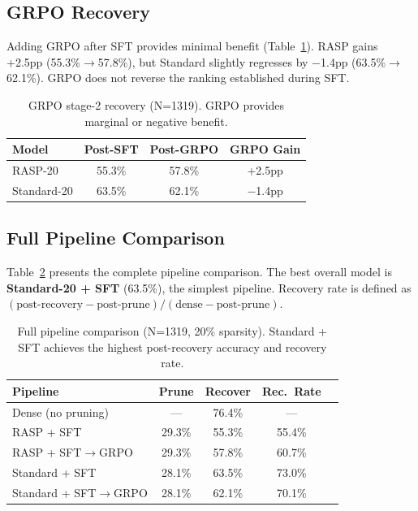\documentclass[11pt,a4paper]{article}
\begin{document}
\subsection{GRPO Recovery}
\label{sec:grpo}

Adding GRPO after SFT provides minimal benefit (Table~\ref{tab:grpo}). RASP gains +2.5pp (55.3\%$\to$57.8\%), but Standard slightly regresses by $-$1.4pp (63.5\%$\to$62.1\%). GRPO does not reverse the ranking established during SFT.

\begin{table}[t]
\centering
\small
\begin{tabular}{lccc}
\toprule
\textbf{Model} & \textbf{Post-SFT} & \textbf{Post-GRPO} & \textbf{GRPO Gain} \\
\midrule
RASP-20 & 55.3\% & 57.8\% & +2.5pp \\
Standard-20 & 63.5\% & 62.1\% & $-$1.4pp \\
\bottomrule
\end{tabular}
\caption{GRPO stage-2 recovery (N=1319). GRPO provides marginal or negative benefit.}
\label{tab:grpo}
\end{table}


\subsection{Full Pipeline Comparison}
\label{sec:pipeline}

Table~\ref{tab:pipeline} presents the complete pipeline comparison. The best overall model is \textbf{Standard-20 + SFT} (63.5\%), the simplest pipeline. Recovery rate is defined as $(\text{post-recovery} - \text{post-prune}) / (\text{dense} - \text{post-prune})$.

\begin{table}[t]
\centering
\small
\begin{tabular}{lcccc}
\toprule
\textbf{Pipeline} & \textbf{Prune} & \textbf{Recover} & \textbf{Rec.\ Rate} \\
\midrule
Dense (no pruning) & --- & 76.4\% & --- \\
RASP + SFT & 29.3\% & 55.3\% & 55.4\% \\
RASP + SFT$\to$GRPO & 29.3\% & 57.8\% & 60.7\% \\
Standard + SFT & 28.1\% & 63.5\% & 73.0\% \\
Standard + SFT$\to$GRPO & 28.1\% & 62.1\% & 70.1\% \\
\bottomrule
\end{tabular}
\caption{Full pipeline comparison (N=1319, 20\% sparsity). Standard + SFT achieves the highest post-recovery accuracy and recovery rate.}
\label{tab:pipeline}
\end{table}
\end{document}
